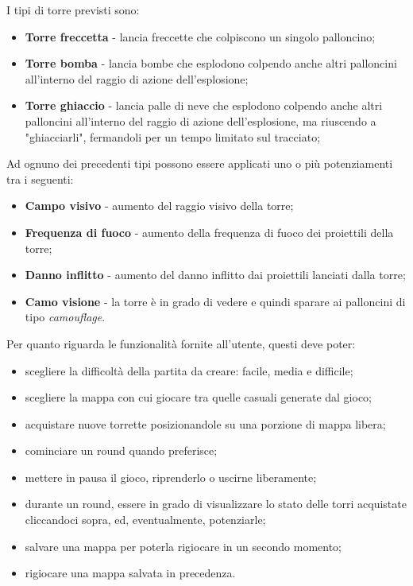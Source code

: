 I tipi di torre previsti sono:
\begin{itemize}
    \item \textbf{Torre freccetta} - lancia freccette che colpiscono un singolo palloncino;
    \item \textbf{Torre bomba} - lancia bombe che esplodono colpendo anche altri palloncini all'interno del raggio di azione dell'esplosione;
    \item \textbf{Torre ghiaccio} - lancia palle di neve che esplodono colpendo anche altri palloncini all'interno del raggio di azione dell'esplosione, ma riuscendo a "ghiacciarli", fermandoli per un tempo limitato sul tracciato;
\end{itemize}
Ad ognuno dei precedenti tipi possono essere applicati uno o più potenziamenti tra i seguenti:
\begin{itemize}
    \item \textbf{Campo visivo} - aumento del raggio visivo della torre;
    \item \textbf{Frequenza di fuoco} - aumento della frequenza di fuoco dei proiettili della torre;
    \item \textbf{Danno inflitto} - aumento del danno inflitto dai proiettili lanciati dalla torre;
    \item \textbf{Camo visione} - la torre è in grado di vedere e quindi sparare ai palloncini di tipo \textit{camouflage}.
\end{itemize}
Per quanto riguarda le funzionalità fornite all'utente, questi deve poter:
\begin{itemize}
    \item scegliere la difficoltà della partita da creare: facile, media e difficile;
    \item scegliere la mappa con cui giocare tra quelle casuali generate dal gioco;
    \item acquistare nuove torrette posizionandole su una porzione di mappa libera;
    \item cominciare un round quando preferisce;
    \item mettere in pausa il gioco, riprenderlo o uscirne liberamente;
    \item durante un round, essere in grado di visualizzare lo stato delle torri acquistate cliccandoci sopra, ed, eventualmente, potenziarle;
    \item salvare una mappa per poterla rigiocare in un secondo momento;
    \item rigiocare una mappa salvata in precedenza.
\end{itemize}

